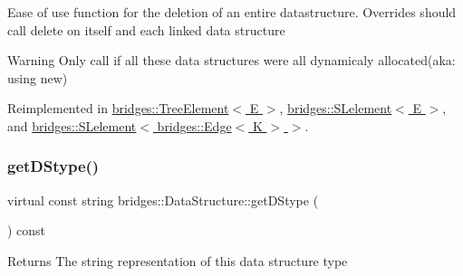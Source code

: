 Ease of use function for the deletion of an entire datastructure. Overrides should call delete on itself and each linked data structure

\begin{DoxyWarning}{Warning}
Only call if all these data structures were all dynamicaly allocated(aka\+: using new) 
\end{DoxyWarning}


Reimplemented in \hyperlink{classbridges_1_1_tree_element_aad832c9f8dfd7e92c7b06a825f406e1d}{bridges\+::\+Tree\+Element$<$ E $>$}, \hyperlink{classbridges_1_1_s_lelement_ac747648849874407e9d907bb4557dd52}{bridges\+::\+S\+Lelement$<$ E $>$}, and \hyperlink{classbridges_1_1_s_lelement_ac747648849874407e9d907bb4557dd52}{bridges\+::\+S\+Lelement$<$ bridges\+::\+Edge$<$ K $>$ $>$}.

\hypertarget{classbridges_1_1_data_structure_a957a63b106e340bc753620c650632bdc}{}\label{classbridges_1_1_data_structure_a957a63b106e340bc753620c650632bdc} 
\subsubsection{\texorpdfstring{get\+D\+Stype()}{getDStype()}}
{\footnotesize\ttfamily virtual const string bridges\+::\+Data\+Structure\+::get\+D\+Stype (\begin{DoxyParamCaption}{ }\end{DoxyParamCaption}) const\hspace{0.3cm}{\ttfamily [pure virtual]}}

\begin{DoxyReturn}{Returns}
The string representation of this data structure type 
\end{DoxyReturn}


